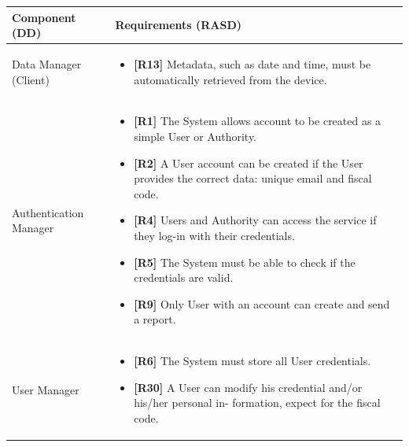 \documentclass{article}
\begin{document}
	\begin{longtable}{| p{5 cm} | p{8 cm} |} \hline
		Component (DD) & Requirements (RASD)  \\ \hline
		\newline Data Manager (Client) & 
		\begin{itemize}
			\item {{\bf[R13]} Metadata, such as date and time, must be automatically retrieved from the device.}
		\end{itemize}	\\ \hline
		\newline Authentication Manager & 
		\begin{itemize}
			\item  {{\bf[R1]} The System allows account to be created as a simple User or Authority.}
			\item  {{\bf [R2]} A User account can be created if the User provides the correct data: unique email and fiscal code.}
			\item  {{\bf [R4]} Users and Authority can access the service if they log-in with their credentials.}
			\item  {{\bf [R5]} The System must be able to check if the credentials are valid.
}
			\item  {{\bf [R9]} Only User with an account can create and send a report.}
		\end{itemize}		\\	 \hline	
		\newline User Manager  & 
		\begin{itemize}
			\item  {{\bf [R6]} The System must store all User credentials.}
			\item {{\bf [R30]}} A User can modify his credential and/or his/her personal in- formation, expect for the fiscal code.


\end{itemize}
\end{longtable}
\end{document}
